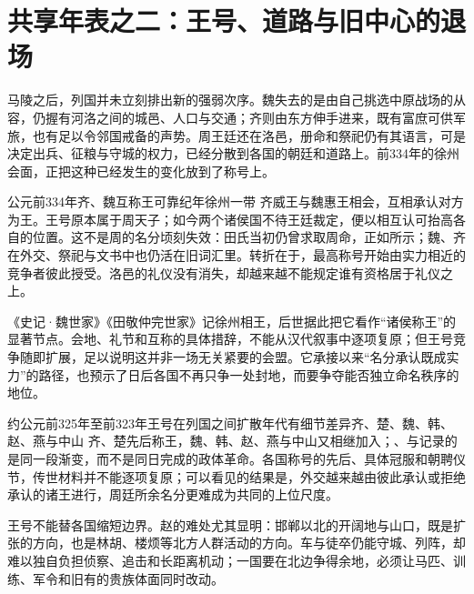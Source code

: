\section{共享年表之二：王号、道路与旧中心的退场}

马陵之后，列国并未立刻排出新的强弱次序。魏失去的是由自己挑选中原战场的从容，仍握有河洛之间的城邑、人口与交通；齐则由东方伸手进来，既有富庶可供军旅，也有足以令邻国戒备的声势。周王廷还在洛邑，册命和祭祀仍有其语言，可是决定出兵、征粮与守城的权力，已经分散到各国的朝廷和道路上。前334年的徐州会面，正把这种已经发生的变化放到了称号上。

\begin{event}{公元前334年}{齐、魏互称王}{可靠纪年}{徐州一带}
齐威王与魏惠王相会，互相承认对方为王。王号原本属于周天子；如今两个诸侯国不待王廷裁定，便以相互认可抬高各自的位置。这不是周的名分顷刻失效：田氏当初仍曾求取周命，正如所示；魏、齐在外交、祭祀与文书中也仍活在旧词汇里。转折在于，最高称号开始由实力相近的竞争者彼此授受。洛邑的礼仪没有消失，却越来越不能规定谁有资格居于礼仪之上。

《史记·魏世家》《田敬仲完世家》记徐州相王，后世据此把它看作“诸侯称王”的显著节点。会地、礼节和互称的具体措辞，不能从汉代叙事中逐项复原；但王号竞争随即扩展，足以说明这并非一场无关紧要的会盟。它承接以来“名分承认既成实力”的路径，也预示了日后各国不再只争一处封地，而要争夺能否独立命名秩序的地位。
\end{event}

\begin{event}{约公元前325年至前323年}{王号在列国之间扩散}{年代有细节差异}{齐、楚、魏、韩、赵、燕与中山}
齐、楚先后称王，魏、韩、赵、燕与中山又相继加入；、与记录的是同一段渐变，而不是同日完成的政体革命。各国称号的先后、具体冠服和朝聘仪节，传世材料并不能逐项复原；可以看见的结果是，外交越来越由彼此承认或拒绝承认的诸王进行，周廷所余名分更难成为共同的上位尺度。
\end{event}

王号不能替各国缩短边界。赵的难处尤其显明：邯郸以北的开阔地与山口，既是扩张的方向，也是林胡、楼烦等北方人群活动的方向。车与徒卒仍能守城、列阵，却难以独自负担侦察、追击和长距离机动；一国要在北边争得余地，必须让马匹、训练、军令和旧有的贵族体面同时改动。

